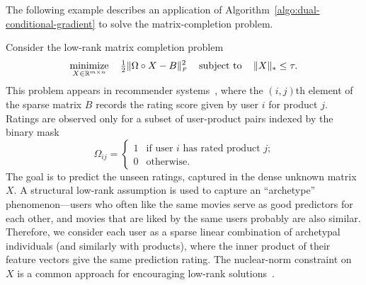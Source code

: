 The following example describes an application of
Algorithm~\ref{algo:dual-conditional-gradient} to solve the matrix-completion problem.

\begin{example}\label{example:dual-conditional-gradient} Consider the low-rank
  matrix completion problem
  \begin{equation} \label{eq:matrix-completion}
    \displaystyle\mathop{\hbox{\rm minimize}}_{X\in\mathbb{R}^{m\times n}}\enspace\enspace{\textstyle{\frac{1}{2}}}\|\Omega\circ X - B \|_{\scriptscriptstyle F}^2
    \enspace\enspace\mathop{\hbox{\rm subject to}}\enspace\enspace\|X\|_* \le\tau.
  \end{equation}
  This problem appears in recommender systems~\cite{bell2007lessons}, where the
  $(i,j)$th element of the sparse matrix $B$ records the rating score given by user
  $i$ for product $j$. Ratings are observed only for a subset of user-product
  pairs indexed by the binary mask
  \[
    \Omega_{ij} =
    \begin{cases}
      1 & \mbox{if user $i$ has rated product $j$;}
    \\0 & \mbox{otherwise.}
    \end{cases}
  \]
  The goal is to predict the unseen ratings, captured in the dense unknown
  matrix $X$. A structural low-rank assumption is used to capture an
  ``archetype'' phenomenon---users who often like the same movies serve as good
  predictors for each other, and movies that are liked by the same users
  probably are also similar. Therefore, we consider each user as a sparse linear
  combination of archetypal individuals (and similarly with products), where the
  inner product of their feature vectors give the same prediction rating. The
  nuclear-norm constraint on $X$ is a common approach for encouraging low-rank
  solutions~\cite{recht2010guaranteed}.


\end{example}
